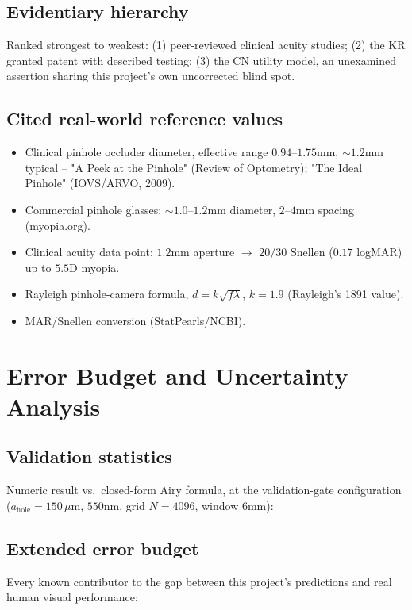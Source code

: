 \documentclass[11pt]{report}
\newcommand{\ahole}{a_{\text{hole}}}
\begin{document}
\section{Evidentiary hierarchy}
Ranked strongest to weakest: (1) peer-reviewed clinical acuity studies; (2) the KR granted patent with described testing; (3) the CN utility model, an unexamined assertion sharing this project's own uncorrected blind spot.

\section{Cited real-world reference values}
\label{sec:clinicalbracket}
\begin{itemize}[leftmargin=1.2cm]
\item Clinical pinhole occluder diameter, effective range $0.94$--$1.75$mm, $\sim1.2$mm typical -- "A Peek at the Pinhole" (Review of Optometry); "The Ideal Pinhole" (IOVS/ARVO, 2009).
\item Commercial pinhole glasses: $\sim1.0$--$1.2$mm diameter, $2$--$4$mm spacing (myopia.org).
\item Clinical acuity data point: $1.2$mm aperture $\to$ $20/30$ Snellen ($0.17$ logMAR) up to $5.5$D myopia.
\item Rayleigh pinhole-camera formula, $d=k\sqrt{f\lambda}$, $k=1.9$ (Rayleigh's 1891 value).
\item MAR/Snellen conversion (StatPearls/NCBI).
\end{itemize}

\chapter{Error Budget and Uncertainty Analysis}
\label{ch:errorbudget}

\section{Validation statistics}
Numeric result vs.\ closed-form Airy formula, at the validation-gate configuration ($\ahole=150\,\mu$m, $550$nm, grid $N{=}4096$, window $6$mm):



\section{Extended error budget}
\label{sec:errorbudget}
Every known contributor to the gap between this project's predictions and real human visual performance:
\end{document}

